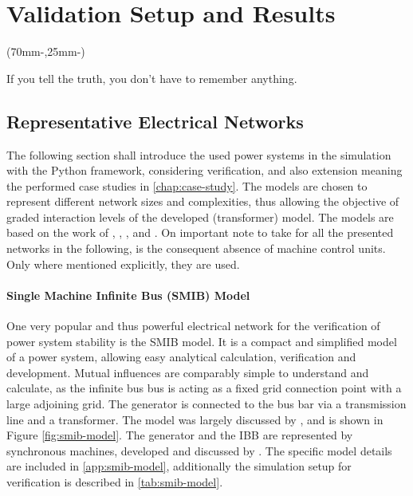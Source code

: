 

\chapter{Validation Setup and Results}
\label{chap:verification}

\begin{textblock*}{.7\textwidth}(70mm-\offset,25mm-\offset)
    \begin{fquote}
        If you tell the truth, you don't have to remember anything.
    \end{fquote}
\end{textblock*}

\section{Representative Electrical Networks}
\label{sec:networks}

The following section shall introduce the used power systems in the simulation with the Python framework, considering verification, and also extension meaning the performed case studies in \autoref{chap:case-study}. 
The models are chosen to represent different network sizes and complexities, thus allowing the objective of graded interaction levels of the developed (transformer) model. 
The models are based on the work of \textcite{machowski_2020}, \textcite{kundur_2022}, \textcite{IEEELoadModeling_2022}, and \textcite{vancutsem_2020}.
On important note to take for all the presented networks in the following, is the consequent absence of machine control units. 
Only where mentioned explicitly, they are used.

\subsubsection{Single Machine Infinite Bus (SMIB) Model}

One very popular and thus powerful electrical network for the verification of power system stability is the \acs{SMIB} model. 
It is a compact and simplified model of a power system, allowing easy analytical calculation, verification and development. 
Mutual influences are comparably simple to understand and calculate, as the infinite bus bus is acting as a fixed grid connection point with a large adjoining grid. 
The generator is connected to the bus bar via a transmission line and a transformer. 
The model was largely discussed by \textcite{kundur_2022}, and is shown in Figure \ref{fig:smib-model}. 
The generator and the \acs{IBB} are represented by synchronous machines, developed and discussed by \textcite{kordowich_2023}. 
The specific model details are included in \autoref{app:smib-model}, additionally the simulation setup for verification is described in \autoref{tab:smib-model}.

